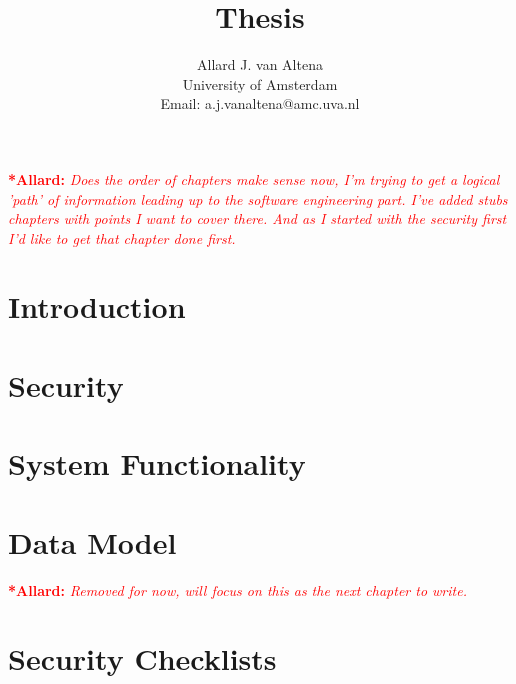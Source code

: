 \documentclass[a4paper]{report}
\title{Thesis}
\author{
	Allard J. van Altena\\
	University of Amsterdam\\
	Email: a.j.vanaltena@amc.uva.nl
}
\newcommand{\allard}[1]{\textcolor{red}{\textbf{*Allard: }\textit{#1}}}
\begin{document}
	
	
	\allard{
		Does the order of chapters make sense now, I'm trying to get a logical 'path' of information leading up to the software engineering part.		
		I've added stubs chapters with points I want to cover there. And as I started with the security first I'd like to get that chapter done first.
	}
	
	\chapter{Introduction}
	\label{introduction}
	

	\chapter{Security}
	\label{security}
	
	
	
	
	\chapter{System Functionality}
	\label{system-functionality}
	
	
	\chapter{Data Model}
	\label{datamodel}
	\allard{Removed for now, will focus on this as the next chapter to write.}
	
	\clearpage
	
	
	\appendix
	\chapter{Security Checklists}
	\label{security-appendix}
\end{document}

